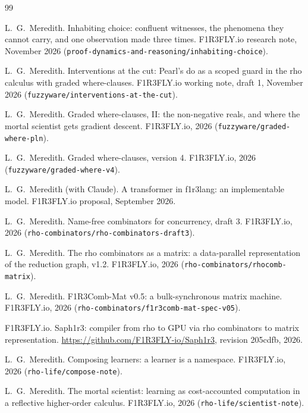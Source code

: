 \documentclass[11pt]{article}
\theoremstyle{plain}
\theoremstyle{definition}
\theoremstyle{remark}
\begin{document}
\begin{thebibliography}{99}\raggedright

 L.~G.~Meredith.
\newblock Inhabiting choice: confluent witnesses, the phenomena they cannot
carry, and one observation made three times.
\newblock F1R3FLY.io research note, November 2026
(\texttt{proof-dynamics-and-reasoning/inhabiting-choice}).

 L.~G.~Meredith.
\newblock Interventions at the cut: Pearl's \textsf{do} as a scoped guard in
the rho calculus with graded where-clauses.
\newblock F1R3FLY.io working note, draft 1, November 2026
(\texttt{fuzzyware/interventions-at-the-cut}).

 L.~G.~Meredith.
\newblock Graded where-clauses, II: the non-negative reals, and where the
mortal scientist gets gradient descent.
\newblock F1R3FLY.io, 2026 (\texttt{fuzzyware/graded-where-pln}).

 L.~G.~Meredith.
\newblock Graded where-clauses, version 4.
\newblock F1R3FLY.io, 2026 (\texttt{fuzzyware/graded-where-v4}).

 L.~G.~Meredith (with Claude).
\newblock A transformer in f1r3lang: an implementable model.
\newblock F1R3FLY.io proposal, September 2026.

 L.~G.~Meredith.
\newblock Name-free combinators for concurrency, draft 3.
\newblock F1R3FLY.io, 2026 (\texttt{rho-combinators/rho-combinators-draft3}).

 L.~G.~Meredith.
\newblock The rho combinators as a matrix: a data-parallel representation of
the reduction graph, v1.2.
\newblock F1R3FLY.io, 2026 (\texttt{rho-combinators/rhocomb-matrix}).

 L.~G.~Meredith.
\newblock F1R3Comb-Mat v0.5: a bulk-synchronous matrix machine.
\newblock F1R3FLY.io, 2026 (\texttt{rho-combinators/f1r3comb-mat-spec-v05}).

 F1R3FLY.io.
\newblock Saph1r3: compiler from rho to GPU via rho combinators to matrix
representation.
\newblock \url{https://github.com/F1R3FLY-io/Saph1r3}, revision 205cdfb, 2026.

 L.~G.~Meredith.
\newblock Composing learners: a learner is a namespace.
\newblock F1R3FLY.io, 2026 (\texttt{rho-life/compose-note}).

 L.~G.~Meredith.
\newblock The mortal scientist: learning as cost-accounted computation in a
reflective higher-order calculus.
\newblock F1R3FLY.io, 2026 (\texttt{rho-life/scientist-note}).


\end{thebibliography}
\end{document}
